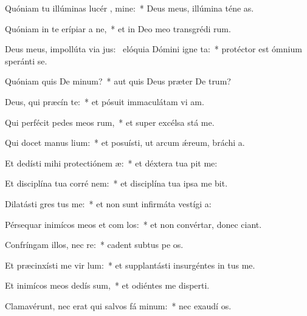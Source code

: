 \item Quóniam tu illúminas lucér , mine:~* Deus meus, illúmina téne as.
\item Quóniam in te erípiar a ne,~* et in Deo meo transgrédi rum.
\item Deus meus, impollúta via jus:~\pscross{} elóquia Dómini igne ta:~* protéctor est ómnium speránti  se.
\item Quóniam quis De  minum?~* aut quis Deus præter De trum?
\item Deus, qui præcín  te:~* et pósuit immaculátam vi am.
\item Qui perfécit pedes meos  rum,~* et super excélsa stá me.
\item Qui docet manus   lium:~* et posuísti, ut arcum ǽreum, bráchi a.
\item Et dedísti mihi protectiónem  æ:~* et déxtera tua pit me:
\item Et disciplína tua corré   nem:~* et disciplína tua ipsa me bit.
\item Dilatásti gres  tus me:~* et non sunt infirmáta vestígi a:
\item Pérsequar inimícos meos et com los:~* et non convértar, donec ciant.
\item Confríngam illos, nec  re:~* cadent subtus pe os.
\item Et præcinxísti me vir  lum:~* et supplantásti insurgéntes in  tus me.
\item Et inimícos meos dedís  sum,~* et odiéntes me disperti.
\item Clamavérunt, nec erat qui salvos fá  minum:~* nec exaudí os.
